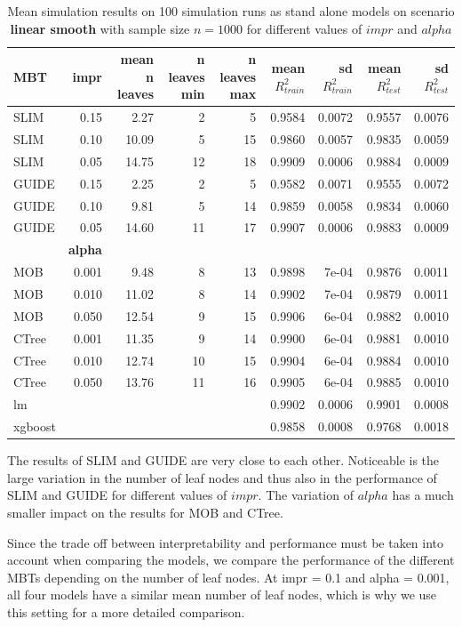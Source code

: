 \begin{table}[!htb] 
\caption{Mean simulation results on 100 simulation runs as stand alone models on scenario \textbf{linear smooth} with sample size $n = 1000$ for different values of $impr$ and $alpha$}
\centering \tiny
\begin{tabular}[t]{l|r|r|r|r|r|r|r|r}
\hline
MBT & \textbf{impr} & mean n leaves & n leaves min & n leaves max & mean $R^2_{train}$ & sd $R^2_{train}$ & mean $R^2_{test}$ & sd $R^2_{test}$\\
\hline
SLIM & 0.15 & 2.27 & 2 & 5 & 0.9584 & 0.0072 & 0.9557 & 0.0076\\
SLIM & 0.10 & 10.09 & 5 & 15 & 0.9860 & 0.0057 & 0.9835 & 0.0059\\
SLIM & 0.05 & 14.75 & 12 & 18 & 0.9909 & 0.0006 & 0.9884 & 0.0009\\
GUIDE & 0.15 & 2.25 & 2 & 5 & 0.9582 & 0.0071 & 0.9555 & 0.0072\\
GUIDE & 0.10 & 9.81 & 5 & 14 & 0.9859 & 0.0058 & 0.9834 & 0.0060\\
GUIDE & 0.05 & 14.60 & 11 & 17 & 0.9907 & 0.0006 & 0.9883 & 0.0009\\
\hline
 & \textbf{alpha} &  &  &  &  &  &  & \\
\hline
MOB & 0.001 & 9.48 & 8 & 13 & 0.9898 & 7e-04 & 0.9876 & 0.0011\\
MOB & 0.010 & 11.02 & 8 & 14 & 0.9902 & 7e-04 & 0.9879 & 0.0011\\
MOB & 0.050 & 12.54 & 9 & 15 & 0.9906 & 6e-04 & 0.9882 & 0.0010\\
CTree & 0.001 & 11.35 & 9 & 14 & 0.9900 & 6e-04 & 0.9881 & 0.0010\\
CTree & 0.010 & 12.74 & 10 & 15 & 0.9904 & 6e-04 & 0.9884 & 0.0010\\
CTree & 0.050 & 13.76 & 11 & 16 & 0.9905 & 6e-04 & 0.9885 & 0.0010\\
\hline
lm & & & & & 0.9902 & 0.0006 & 0.9901 & 0.0008\\
xgboost & & & & & 0.9858 & 0.0008 & 0.9768 & 0.0018\\
\hline
\end{tabular}
\label{tab:linear_smooth_summary}
\end{table}
The results of SLIM and GUIDE are very close to each other. Noticeable is the large variation in the number of leaf nodes and thus also in the performance of SLIM and GUIDE for different values of $impr$. The variation of $alpha$ has a much smaller impact on the results for MOB and CTree.

Since the trade off between interpretability and performance must be taken into account when comparing the models, we compare the performance of the different MBTs depending on the number of leaf nodes. 
At impr = 0.1 and alpha = 0.001, all four models have a similar mean number of leaf nodes, which is why we use this setting for a more detailed comparison.


